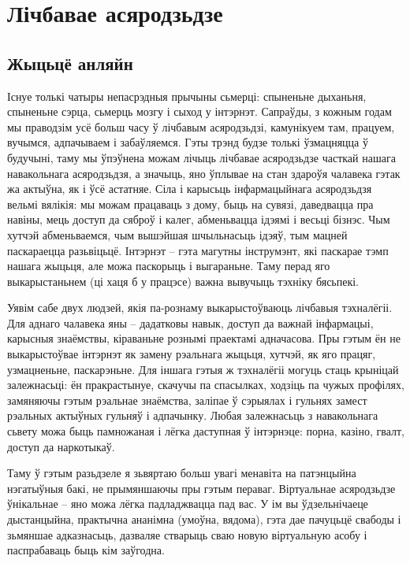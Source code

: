 \chapter{Лічбавае асяродзьдзе}

\section{Жыцьцё анляйн}

Існуе толькі чатыры непасрэдныя прычыны сьмерці: спыненьне дыханьня, спыненьне сэрца, сьмерць мозгу і сыход у інтэрнэт. Сапраўды, з кожным годам мы праводзім усё больш часу ў лічбавым асяродзьдзі, камунікуем там, працуем, вучымся, адпачываем і забаўляемся. Гэты трэнд будзе толькі ўзмацняцца ў будучыні, таму мы ўпэўнена можам лічыць лічбавае асяродзьдзе часткай нашага навакольнага асяродзьдзя, а значыць, яно ўплывае на стан здароўя чалавека гэтак жа актыўна, як і ўсё астатняе. Сіла і карысьць інфармацыйнага асяродзьдзя вельмі вялікія: мы можам працаваць з дому, быць на сувязі, даведвацца пра навіны, мець доступ да сяброў і калег, абменьвацца ідэямі і весьці бізнэс. Чым хутчэй абменьваемся, чым вышэйшая шчыльнасьць ідэяў, тым мацней паскараецца разьвіцьцё. Інтэрнэт – гэта магутны інструмэнт, які паскарае тэмп нашага жыцьця, але можа паскорыць і выгараньне. Таму перад яго выкарыстаньнем (ці хаця б у працэсе) важна вывучыць тэхніку бясьпекі.

Уявім сабе двух людзей, якія па-рознаму выкарыстоўваюць лічбавыя тэхналёгіі. Для аднаго чалавека яны – дадатковы навык, доступ да важнай інфармацыі, карысныя знаёмствы, кіраваньне рознымі праектамі адначасова. Пры гэтым ён не выкарыстоўвае інтэрнэт як замену рэальнага жыцьця, хутчэй, як яго працяг, узмацненьне, паскарэньне. Для іншага гэтыя ж тэхналёгіі могуць стаць крыніцай залежнасьці: ён пракрастынуе, скачучы па спасылках, ходзіць па чужых профілях, замяняючы гэтым рэальнае знаёмства, заліпае ў сэрыялах і гульнях замест рэальных актыўных гульняў і адпачынку. Любая залежнасьць з навакольнага сьвету можа быць памножаная і лёгка даступная ў інтэрнэце: порна, казіно, гвалт, доступ да наркотыкаў.

Таму ў гэтым разьдзеле я зьвяртаю больш увагі менавіта на патэнцыйна нэгатыўныя бакі, не прымяншаючы пры гэтым пераваг. Віртуальнае асяродзьдзе ўнікальнае – яно можа лёгка падладжвацца пад вас. У ім вы ўдзельнічаеце дыстанцыйна, практычна ананімна (умоўна, вядома), гэта дае пачуцьцё свабоды і зьмяншае адказнасьць, дазваляе стварыць сваю новую віртуальную асобу і паспрабаваць быць кім заўгодна.

